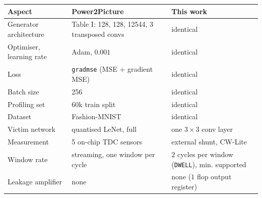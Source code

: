 \begin{tabular}{lll}
\hline
Aspect & Power2Picture & This work \\
\hline
Generator architecture & Table I: 128, 128, 12544, 3 transposed convs & identical \\
Optimiser, learning rate & Adam, $0.001$ & identical \\
Loss & \texttt{gradmse} (MSE + gradient MSE) & identical \\
Batch size & 256 & identical \\
Profiling set & 60k train split & identical \\
Dataset & Fashion-MNIST & identical \\
Victim network & quantised LeNet, full & one $3\times3$ conv layer \\
Measurement & 5 on-chip TDC sensors & external shunt, CW-Lite \\
Window rate & streaming, one window per cycle & $2$ cycles per window (\texttt{DWELL}), min. supported \\
Leakage amplifier & none & none ($1$ flop output register) \\
\hline
\end{tabular}
